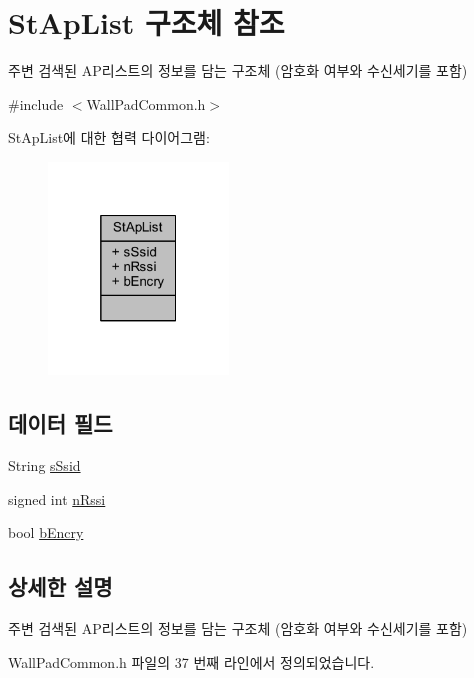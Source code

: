 \hypertarget{struct_st_ap_list}{}\section{St\+Ap\+List 구조체 참조}
\label{struct_st_ap_list}


주변 검색된 A\+P리스트의 정보를 담는 구조체 (암호화 여부와 수신세기를 포함)  




{\ttfamily \#include $<$Wall\+Pad\+Common.\+h$>$}



St\+Ap\+List에 대한 협력 다이어그램\+:\nopagebreak
\begin{figure}[H]
\begin{center}
\leavevmode
\includegraphics[width=136pt]{struct_st_ap_list__coll__graph}
\end{center}
\end{figure}
\subsection*{데이터 필드}
\begin{DoxyCompactItemize}
\item 
String \mbox{\hyperlink{struct_st_ap_list_a174040ae2c2468aa44f5c18ad915e7a3}{s\+Ssid}}
\item 
signed int \mbox{\hyperlink{struct_st_ap_list_a04d6ede44986822269e924bb50a48369}{n\+Rssi}}
\item 
bool \mbox{\hyperlink{struct_st_ap_list_a3491c9e85ee7dced99ca9b0ff6ea0327}{b\+Encry}}
\end{DoxyCompactItemize}


\subsection{상세한 설명}
주변 검색된 A\+P리스트의 정보를 담는 구조체 (암호화 여부와 수신세기를 포함) 

Wall\+Pad\+Common.\+h 파일의 37 번째 라인에서 정의되었습니다.



